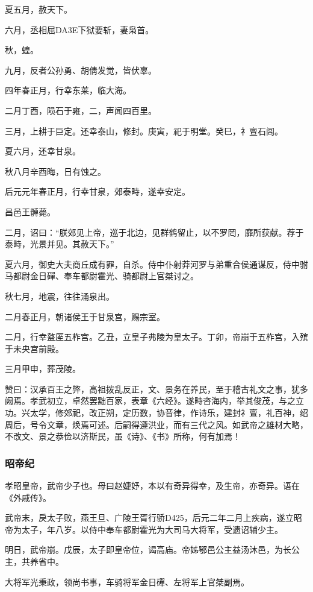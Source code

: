 \documentclass[]{article}
\begin{document}
夏五月，赦天下。

六月，丞相屈DA3E下狱要斩，妻枭首。

秋，蝗。

九月，反者公孙勇、胡倩发觉，皆伏辜。

四年春正月，行幸东莱，临大海。

二月丁酉，陨石于雍，二，声闻四百里。

三月，上耕于巨定。还幸泰山，修封。庚寅，祀于明堂。癸巳，礻亶石闾。

夏六月，还幸甘泉。

秋八月辛酉晦，日有蚀之。

后元元年春正月，行幸甘泉，郊泰畤，遂幸安定。

昌邑王髆薨。

二月，诏曰：``朕郊见上帝，巡于北边，见群鹤留止，以不罗罔，靡所获献。荐于泰畤，光景并见。其赦天下。''

夏六月，御史大夫商丘成有罪，自杀。侍中仆射莽河罗与弟重合侯通谋反，侍中驸马都尉金日磾、奉车都尉霍光、骑都尉上官桀讨之。

秋七月，地震，往往涌泉出。

二月春正月，朝诸侯王于甘泉宫，赐宗室。

二月，行幸盩厔五柞宫。乙丑，立皇子弗陵为皇太子。丁卯，帝崩于五柞宫，入殡于未央宫前殿。

三月甲申，葬茂陵。

赞曰：汉承百王之弊，高祖拨乱反正，文、景务在养民，至于稽古礼文之事，犹多阙焉。孝武初立，卓然罢黜百家，表章《六经》。遂畤咨海内，举其俊茂，与之立功。兴太学，修郊祀，改正朔，定历数，协音律，作诗乐，建封礻亶，礼百神，绍周后，号令文章，焕焉可述。后嗣得遵洪业，而有三代之风。如武帝之雄材大略，不改文、景之恭俭以济斯民，虽《诗》、《书》所称，何有加焉！

\hypertarget{header-n646}{%
\subsubsection{昭帝纪}\label{header-n646}}

孝昭皇帝，武帝少子也。母曰赵婕妤，本以有奇异得幸，及生帝，亦奇异。语在《外戚传》。

武帝末，戾太子败，燕王旦、广陵王胥行骄D425，后元二年二月上疾病，遂立昭帝为太子，年八岁。以侍中奉车都尉霍光为大司马大将军，受遗诏辅少主。

明日，武帝崩。戊辰，太子即皇帝位，谒高庙。帝姊鄂邑公主益汤沐邑，为长公主，共养省中。

大将军光秉政，领尚书事，车骑将军金日磾、左将军上官桀副焉。
\end{document}

